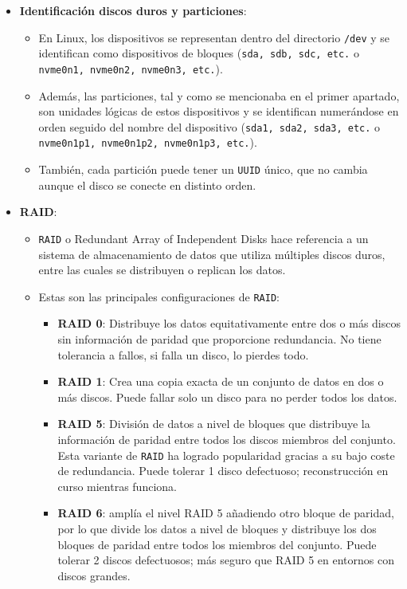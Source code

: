 \documentclass[10pt]{article}
\begin{document}
\begin{itemize}
\begin{itemize}
		\end{itemize}
		\item \textbf{Identificación discos duros y particiones}:
		\begin{itemize}
			\item En Linux, los dispositivos se representan dentro del directorio \verb|/dev| y se identifican como dispositivos de bloques (\verb|sda, sdb, sdc, etc.| o \verb|nvme0n1, nvme0n2, nvme0n3, etc.|).
			\item Además, las particiones, tal y como se mencionaba en el primer apartado, son unidades lógicas de estos dispositivos y se identifican numerándose en orden seguido del nombre del dispositivo (\verb|sda1, sda2, sda3, etc.| o \verb|nvme0n1p1, nvme0n1p2, nvme0n1p3, etc.|).\cite{Discos}
			\item También, cada partición puede tener un \verb|UUID| único, que no cambia aunque el disco se conecte en distinto orden.
		\end{itemize}
		\item \textbf{RAID}: 
		\begin{itemize}
			\item \verb|RAID| o Redundant Array of Independent Disks hace referencia a un sistema de almacenamiento de datos que utiliza múltiples discos duros, entre las cuales se distribuyen o replican los datos. \cite{RAID}
			\item Estas son las principales configuraciones de \verb|RAID|:
			\begin{itemize}
				\item \textbf{RAID 0}: Distribuye los datos equitativamente entre dos o más discos sin información de paridad que proporcione redundancia. No tiene tolerancia a fallos, si falla un disco, lo pierdes todo.
				\item \textbf{RAID 1}: Crea una copia exacta de un conjunto de datos en dos o más discos. Puede fallar solo un disco para no perder todos los datos.
				\item \textbf{RAID 5}: División de datos a nivel de bloques que distribuye la información de paridad entre todos los discos miembros del conjunto. Esta variante de \verb|RAID| ha logrado popularidad gracias a su bajo coste de redundancia. Puede tolerar 1 disco defectuoso; reconstrucción en curso mientras funciona.
				\item \textbf{RAID 6}: amplía el nivel RAID 5 añadiendo otro bloque de paridad, por lo que divide los datos a nivel de bloques y distribuye los dos bloques de paridad entre todos los miembros del conjunto. Puede tolerar 2 discos defectuosos; más seguro que RAID 5 en entornos con discos grandes.
			\end{itemize}
		\end{itemize}
	\end{itemize}
	
\end{document}
